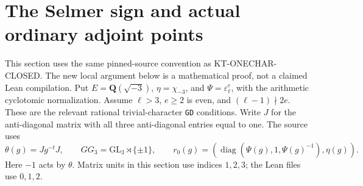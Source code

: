 \section{The Selmer sign and actual ordinary adjoint points}
\label{sec:kt-host-sign}

This section uses the same pinned-source convention as
KT-ONECHAR-CLOSED.  The new local argument below is a mathematical
proof, not a claimed Lean compilation.  Put
$E=\mathbf Q(\sqrt{-3})$, $\eta=\chi_{-3}$, and
$\Psi=\varepsilon_\ell^e$, with the arithmetic cyclotomic
normalization.  Assume $\ell>3$, $e\geq2$ is even, and
$(\ell-1)\nmid2e$.  These are the relevant rational trivial-character
\texttt{GD} conditions.  Write $J$ for the anti-diagonal matrix with
all three anti-diagonal entries equal to one.  The source uses
\[
 \theta(g)=Jg^{-t}J,\qquad
 GG_3=\mathrm{GL}_3\rtimes\{\pm1\},\qquad
 r_0(g)=(\operatorname{diag}(\Psi(g),1,\Psi(g)^{-1}),\eta(g)).
                                                               \tag{HS.1}
\]
Here $-1$ acts by $\theta$.  Matrix units in this section use
indices $1,2,3$; the Lean files use $0,1,2$.

